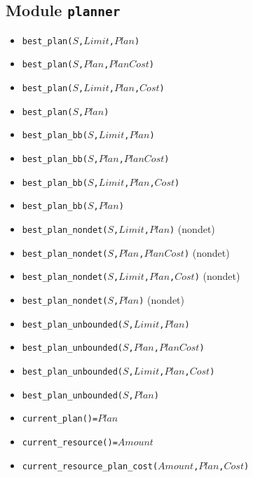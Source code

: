 \documentclass[10pt]{article}
\begin{document}
\begin{multicols}{2}
\section*{Module \texttt{planner}}  
\begin{scriptsize}
\begin{itemize}
\item \texttt{best\_plan($S$,$Limit$,$Plan$)}
\item \texttt{best\_plan($S$,$Plan$,$PlanCost$)}
\item \texttt{best\_plan($S$,$Limit$,$Plan$,$Cost$)}
\item \texttt{best\_plan($S$,$Plan$)}
\item \texttt{best\_plan\_bb($S$,$Limit$,$Plan$)}
\item \texttt{best\_plan\_bb($S$,$Plan$,$PlanCost$)}
\item \texttt{best\_plan\_bb($S$,$Limit$,$Plan$,$Cost$)}
\item \texttt{best\_plan\_bb($S$,$Plan$)}
\item \texttt{best\_plan\_nondet($S$,$Limit$,$Plan$)} (nondet)
\item \texttt{best\_plan\_nondet($S$,$Plan$,$PlanCost$)} (nondet)
\item \texttt{best\_plan\_nondet($S$,$Limit$,$Plan$,$Cost$)} (nondet)
\item \texttt{best\_plan\_nondet($S$,$Plan$)} (nondet)
\item \texttt{best\_plan\_unbounded($S$,$Limit$,$Plan$)}
\item \texttt{best\_plan\_unbounded($S$,$Plan$,$PlanCost$)}
\item \texttt{best\_plan\_unbounded($S$,$Limit$,$Plan$,$Cost$)}
\item \texttt{best\_plan\_unbounded($S$,$Plan$)}
\item \texttt{current\_plan()=$Plan$}
\item \texttt{current\_resource()=$Amount$}
\item \texttt{current\_resource\_plan\_cost($Amount$,$Plan$,$Cost$)}

\end{itemize}
\end{scriptsize}
\end{multicols}
\end{document}
